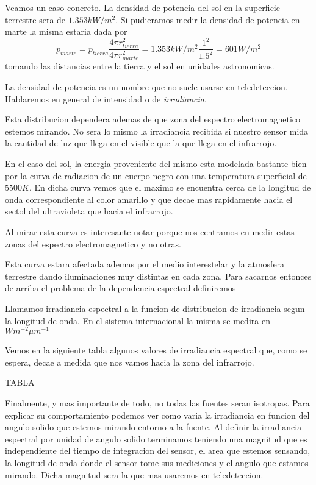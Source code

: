 \begin{exa}
  Veamos un caso concreto. La densidad de potencia del sol en la superficie
  terrestre sera de $1.353 kW/m^2$. Si pudieramos medir la densidad de potencia
  en marte la misma estaria dada por
  $$ p_{marte} = p_{tierra} \frac{4\pi r_{tierra}^2}{4\pi r_{marte}^2}= 1.353
  kW/m^2 \frac{1^2}{1.5^2} = 601 W/m^2$$
  tomando las distancias entre la tierra y el sol en unidades astronomicas.
\end{exa}

\begin{obs}
  La densidad de potencia es un nombre que no suele usarse en teledeteccion.
  Hablaremos en general de intensidad o de \emph{irradiancia}.
\end{obs}

Esta distribucion dependera ademas de que zona del espectro electromagnetico
estemos mirando. No sera lo mismo la irradiancia recibida si nuestro sensor mida
la cantidad de luz que llega en el visible que la que llega en el infrarrojo.

En el caso del sol, la energia proveniente del mismo esta modelada bastante bien
por la curva de radiacion de un cuerpo negro con una temperatura superficial de
$5500 K$. En dicha curva vemos que el maximo se encuentra cerca de la longitud
de onda correspondiente al color amarillo y que decae mas rapidamente hacia el
sectol del ultravioleta que hacia el infrarrojo.

\begin{obs}
  Al mirar esta curva es interesante notar porque nos centramos en medir estas
  zonas del espectro electromagnetico y no otras.
\end{obs}

Esta curva estara afectada ademas por el medio interestelar y la atmosfera
terrestre dando iluminaciones muy distintas en cada zona. Para sacarnos entonces
de arriba el problema de la dependencia espectral definiremos

\begin{dex}
  Llamamos irradiancia espectral a la funcion de distribucion de irradiancia
  segun la longitud de onda. En el sistema internacional la misma se medira en
  $W m^{-2} \mu m^{-1}$
\end{dex}

Vemos en la siguiente tabla algunos valores de irradiancia espectral que, como
se espera, decae a medida que nos vamos hacia la zona del infrarrojo.

TABLA

Finalmente, y mas importante de todo, no todas las fuentes seran isotropas. Para
explicar su comportamiento podemos ver como varia la irradiancia en funcion del
angulo solido que estemos mirando entorno a la fuente. Al definir la irradiancia
espectral por unidad de angulo solido terminamos teniendo una magnitud que es
independiente del tiempo de integracion del sensor, el area que estemos
sensando, la longitud de onda donde el sensor tome sus mediciones  y el angulo
que estamos mirando. Dicha magnitud sera la que mas usaremos en teledeteccion.

